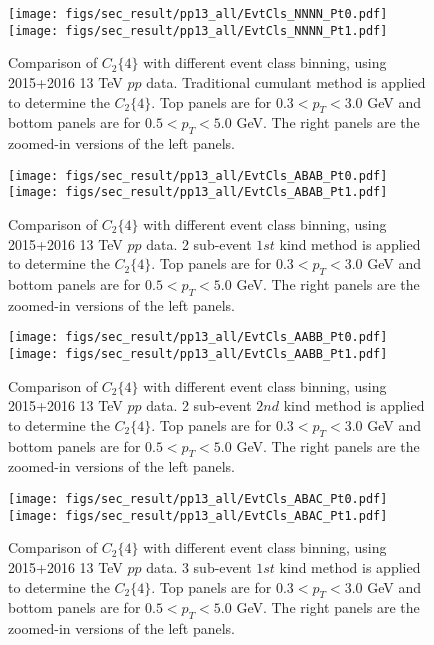 \begin{figure}[H]
\centering
\texttt{[image: figs/sec\_result/pp13\_all/EvtCls\_NNNN\_Pt0.pdf]}
\texttt{[image: figs/sec\_result/pp13\_all/EvtCls\_NNNN\_Pt1.pdf]}
\caption{Comparison of $C_{2}\{4\}$ with different event class binning, using 2015+2016 13 TeV $pp$ data. Traditional cumulant method is applied to determine the $C_{2}\{4\}$. Top panels are for $0.3<p_{T}<3.0$ GeV and bottom panels are for $0.5<p_{T}<5.0$ GeV. The right panels are the zoomed-in versions of the left panels.}
\label{fig:result_pp13_all_EvtCls_NNNN}
\end{figure}

\begin{figure}[H]
\centering
\texttt{[image: figs/sec\_result/pp13\_all/EvtCls\_ABAB\_Pt0.pdf]}
\texttt{[image: figs/sec\_result/pp13\_all/EvtCls\_ABAB\_Pt1.pdf]}
\caption{Comparison of $C_{2}\{4\}$ with different event class binning, using 2015+2016 13 TeV $pp$ data. 2 sub-event $1st$ kind method is applied to determine the $C_{2}\{4\}$. Top panels are for $0.3<p_{T}<3.0$ GeV and bottom panels are for $0.5<p_{T}<5.0$ GeV. The right panels are the zoomed-in versions of the left panels.}
\label{fig:result_pp13_all_EvtCls_ABAB}
\end{figure}

\begin{figure}[H]
\centering
\texttt{[image: figs/sec\_result/pp13\_all/EvtCls\_AABB\_Pt0.pdf]}
\texttt{[image: figs/sec\_result/pp13\_all/EvtCls\_AABB\_Pt1.pdf]}
\caption{Comparison of $C_{2}\{4\}$ with different event class binning, using 2015+2016 13 TeV $pp$ data. 2 sub-event $2nd$ kind method is applied to determine the $C_{2}\{4\}$. Top panels are for $0.3<p_{T}<3.0$ GeV and bottom panels are for $0.5<p_{T}<5.0$ GeV. The right panels are the zoomed-in versions of the left panels.}
\label{fig:result_pp13_all_EvtCls_AABB}
\end{figure}

\begin{figure}[H]
\centering
\texttt{[image: figs/sec\_result/pp13\_all/EvtCls\_ABAC\_Pt0.pdf]}
\texttt{[image: figs/sec\_result/pp13\_all/EvtCls\_ABAC\_Pt1.pdf]}
\caption{Comparison of $C_{2}\{4\}$ with different event class binning, using 2015+2016 13 TeV $pp$ data. 3 sub-event $1st$ kind method is applied to determine the $C_{2}\{4\}$. Top panels are for $0.3<p_{T}<3.0$ GeV and bottom panels are for $0.5<p_{T}<5.0$ GeV. The right panels are the zoomed-in versions of the left panels.}
\label{fig:result_pp13_all_EvtCls_ABAC}
\end{figure}

